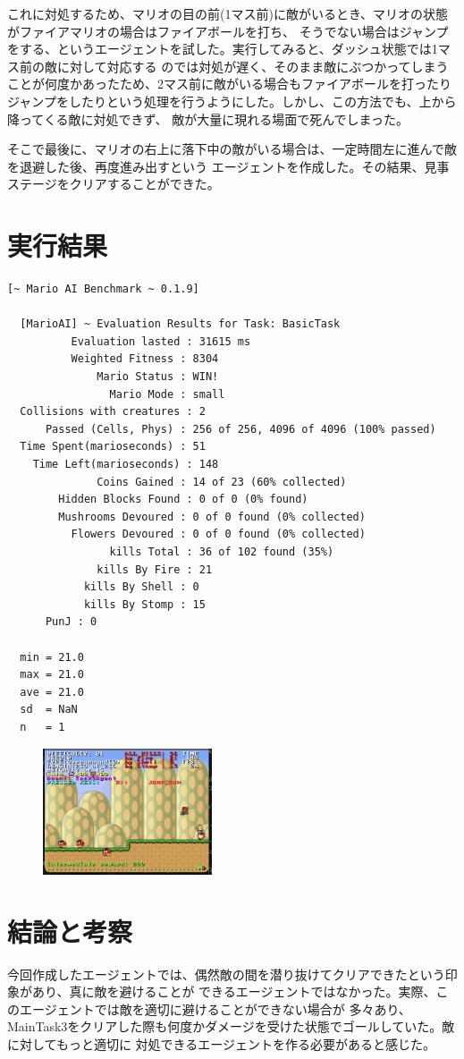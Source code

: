 \documentclass[a4paper,11pt]{jsarticle}
\begin{document}
これに対処するため、マリオの目の前(1マス前)に敵がいるとき、マリオの状態がファイアマリオの場合はファイアボールを打ち、
そうでない場合はジャンプをする、というエージェントを試した。実行してみると、ダッシュ状態では1マス前の敵に対して対応する
のでは対処が遅く、そのまま敵にぶつかってしまうことが何度かあったため、2マス前に敵がいる場合もファイアボールを打ったり
ジャンプをしたりという処理を行うようにした。しかし、この方法でも、上から降ってくる敵に対処できず、
敵が大量に現れる場面で死んでしまった。

そこで最後に、マリオの右上に落下中の敵がいる場合は、一定時間左に進んで敵を退避した後、再度進み出すという
エージェントを作成した。その結果、見事ステージをクリアすることができた。

\section*{実行結果}

\begin{lstlisting}[caption=実行結果]
  [~ Mario AI Benchmark ~ 0.1.9]

  [MarioAI] ~ Evaluation Results for Task: BasicTask
          Evaluation lasted : 31615 ms
          Weighted Fitness : 8304
              Mario Status : WIN!
                Mario Mode : small
  Collisions with creatures : 2
      Passed (Cells, Phys) : 256 of 256, 4096 of 4096 (100% passed)
  Time Spent(marioseconds) : 51
    Time Left(marioseconds) : 148
              Coins Gained : 14 of 23 (60% collected)
        Hidden Blocks Found : 0 of 0 (0% found)
        Mushrooms Devoured : 0 of 0 found (0% collected)
          Flowers Devoured : 0 of 0 found (0% collected)
                kills Total : 36 of 102 found (35%)
              kills By Fire : 21
            kills By Shell : 0
            kills By Stomp : 15
      PunJ : 0

  min = 21.0
  max = 21.0
  ave = 21.0
  sd  = NaN
  n   = 1
\end{lstlisting}

\begin{figure}
  \begin{center}
    \includegraphics*[width=50mm]{images/report3/reaching-goal.png}
  \end{center}
\end{figure}

\section*{結論と考察}
今回作成したエージェントでは、偶然敵の間を潜り抜けてクリアできたという印象があり、真に敵を避けることが
できるエージェントではなかった。実際、このエージェントでは敵を適切に避けることができない場合が
多々あり、MainTask3をクリアした際も何度かダメージを受けた状態でゴールしていた。敵に対してもっと適切に
対処できるエージェントを作る必要があると感じた。

\printbibliography[title=参考文献]
\end{document}
